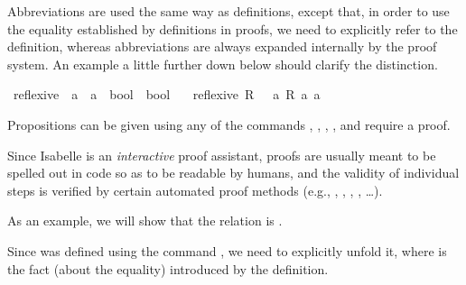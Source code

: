 \begin{isabellebody}
\begin{isamarkuptext}%
Abbreviations are used the same way as definitions, except that, in order to use the equality established by definitions in proofs, we need to explicitly refer to the definition, whereas abbreviations are always expanded internally by the proof system. An example a little further down below should clarify the distinction.%
\end{isamarkuptext}\isamarkuptrue%
\isamarkupfalse%
\ reflexive\ {\isacharcolon}{\kern0pt}{\isacharcolon}{\kern0pt}\ {\isacartoucheopen}{\isacharparenleft}{\kern0pt}{\isacharprime}{\kern0pt}a\ {\isasymRightarrow}\ {\isacharprime}{\kern0pt}a\ {\isasymRightarrow}\ bool{\isacharparenright}{\kern0pt}\ {\isasymRightarrow}\ bool{\isacartoucheclose}\isanewline
\ \ \ {\isacartoucheopen}reflexive\ R\ {\isasymequiv}\ {\isasymforall}\ a{\isachardot}{\kern0pt}\ R\ a\ a{\isacartoucheclose}%
\isadelimdocument
%
\endisadelimdocument
%
\isatagdocument
%
\isamarkuptrue%
%
\endisatagdocument
{\isafolddocument}%
%
\isadelimdocument
%
\endisadelimdocument
%
\begin{isamarkuptext}%
Propositions can be given using any of the commands , , , , and require a proof.

Since Isabelle is an \emph{interactive} proof assistant, proofs are usually meant to be spelled out in code so as to be readable by humans, and the validity of individual steps is verified by certain automated proof methods (e.g.\@ {}, , , , , \dots). 

As an example, we will show that the relation  is .

Since  was defined using the command , we need to explicitly unfold it, where  is the fact (about the equality) introduced by the definition.


\end{isamarkuptext}
\end{isabellebody}

